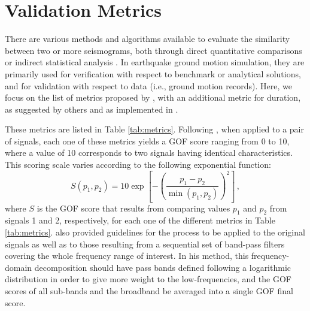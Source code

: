 
\section{Validation Metrics} 
\label{sec:validation-metrics}

There are various methods and algorithms available to evaluate the similarity between two or more seismograms, both through direct quantitative comparisons or indirect statistical analysis \citep[e.g.,][]{Anderson_2004_Proc, Kristekova_2006_BSSA, Kristekova_2009_GJI, Olsen_2010_SRL, Burks_BSSA_2014, Rezaeian_2015_BSSA}. In earthquake ground motion simulation, they are primarily used for verification with respect to benchmark or analytical solutions, and for validation with respect to data (i.e., ground motion records). Here, we focus on the list of metrics proposed by \citet{Anderson_2004_Proc}, with an additional metric for duration, as suggested by others \citep{Olsen_2010_SRL, Maufroy_2015_BSSA} and as implemented in \citet{Taborda_2013_BSSA}.



These metrics are listed in Table \ref{tab:metrics}. Following \citet{Anderson_2004_Proc}, when applied to a pair of signals, each one of these metrics yields a GOF score ranging from 0 to 10, where a value of 10 corresponds to two signals having identical characteristics. This scoring scale varies according to the following exponential function:
% 
\begin{equation}
\label{eq:gof-function}
	S \left( p_1, p_2 \right) = 10 \exp{ \left[ - \left( \frac{p_1 - p_2}{ \min\left( p_1, p_2 \right) } \right)^2 \right] }
	\, ,
\end{equation}
% 
\noindent
where $S$ is the GOF score that results from comparing values $p_1$ and $p_2$ from signals 1 and 2, respectively, for each one of the different metrics in Table \ref{tab:metrics}. \citeauthor{Anderson_2004_Proc} also provided guidelines for the process to be applied to the original signals as well as to those resulting from a sequential set of band-pass filters covering the whole frequency range of interest. In his method, this frequency-domain decomposition should have pass bands defined following a logarithmic distribution in order to give more weight to the low-frequencies, and the GOF scores of all sub-bands and the broadband be averaged into a single GOF final score.

